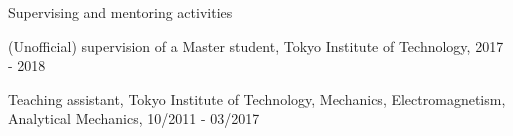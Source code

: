 \documentclass[a4paper]{resume} %
\begin{document}
\begin{rSection}{Supervising and mentoring activities}
	\begin{etaremune}
    \item (Unofficial) supervision of a Master student, Tokyo Institute of Technology, 2017 - 2018
    \item Teaching assistant, Tokyo Institute of Technology, Mechanics, Electromagnetism, Analytical Mechanics, 10/2011 - 03/2017
\end{etaremune}
\end{rSection}
\end{document}
